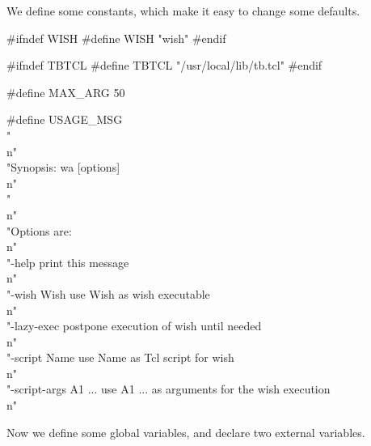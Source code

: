 
We define some constants, which make it easy to change some defaults.

\nwenddocs{}\endmoddef\let\nwnotused=\nwoutput{}\nwstartdeflinemarkup{}\nwenddeflinemarkup
#ifndef WISH
#define WISH    "wish"
#endif

#ifndef TBTCL
#define TBTCL   "/usr/local/lib/tb.tcl"
#endif

#define MAX_ARG 50


#define USAGE_MSG \\
   "\\n" \\
   "Synopsis: wa [options]\\n" \\
   "\\n" \\
   "Options are:\\n" \\
   "-help                 print this message\\n" \\
   "-wish Wish            use Wish as wish executable\\n" \\
   "-lazy-exec            postpone execution of wish until needed\\n" \\
   "-script Name          use Name as Tcl script for wish\\n" \\
   "-script-args A1 ...   use A1 ... as arguments for the wish execution\\n"
\nwendcode{}\nwdocspar


Now we define some global variables, and declare two external variables.

